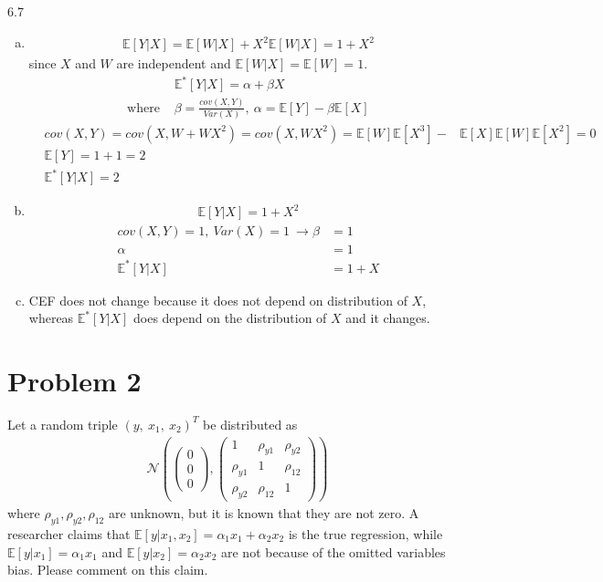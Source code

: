 \documentclass[a4paper]{article}
\newcommand{\norma}{\mathscr{N}}
\newcommand{\expect}{\mathbb{E}}
\begin{document}
6.7

\begin{enumerate}[(a)]
	\item \begin{align*}
	\expect[Y|X] = \expect[W|X] + X^2\expect[W|X] = 1 + X^2
	\end{align*}
	since $X$ and $W$ are independent and $\expect[W|X] = \expect[W] = 1$.
	\begin{align*}
	&\expect^*[Y|X] = \alpha + \beta X\\
	\text{where } &\beta = \frac{cov(X, Y)}{Var(X)},\ \alpha = \expect[Y] - \beta \expect[X]
	\end{align*}
	\begin{align*}
	&cov(X, Y) = cov(X, W + WX^2) = cov(X, WX^2) = \expect[W]\expect[X^3] - &\expect[X]\expect[W]\expect[X^2] = 0\\
	&\expect[Y] = 1 + 1 = 2\\
	&\expect^*[Y|X] = 2
	\end{align*}
	\item 
	\begin{align*}
	\expect[Y|X] = 1 + X^2
	\end{align*}\begin{align*}
	cov(X, Y) = 1,\ Var(X) = 1\ \to \beta &= 1\\
	\alpha &= 1\\
	\expect^*[Y|X] &= 1 + X
	\end{align*}
	\item CEF does not change because it does not depend on distribution of $X$, whereas $\expect^*[Y|X]$ does depend on the distribution of $X$ and it changes.
\end{enumerate}
	\section*{Problem 2}
	Let a random triple $(y,\ x_1,\ x_2)^T$ be distributed as
	\begin{align*}
	\norma \left( \begin{pmatrix}
	0\\
	0\\
	0
	\end{pmatrix}, \begin{pmatrix}
	1 & \rho_{y1} & \rho_{y2}\\
	\rho_{y1} & 1 & \rho_{12}\\
	\rho_{y2} & \rho_{12} & 1
	\end{pmatrix} \right)
	\end{align*}
	where $\rho_{y1}, \rho_{y2}, \rho_{12}$ are unknown, but it is known that they are not zero. A researcher claims
	that $\expect[y|x_1, x_2] = \alpha_1 x_1 +\alpha_2x_2$ is the true regression, while $\expect[y|x_1] =\alpha_1x_1$ and $\expect[y|x_2] =\alpha_2x_2$ are not because of the omitted variables bias. Please comment on this claim.
	
\end{document}
